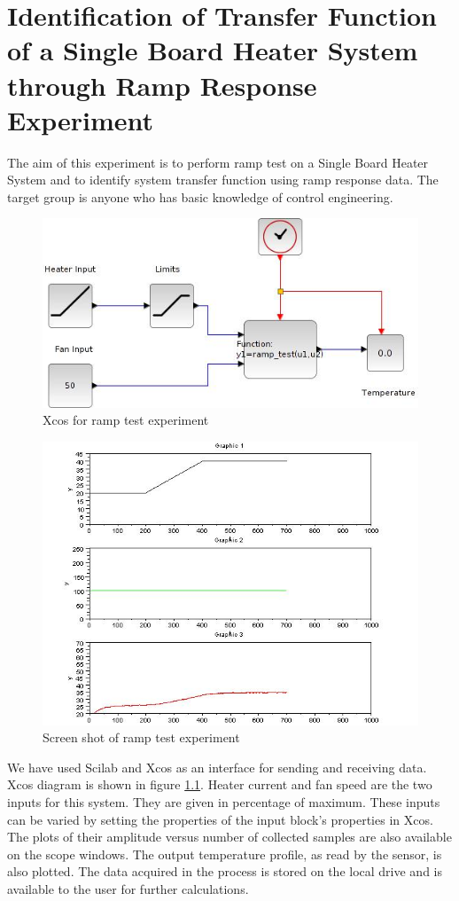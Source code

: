 \chapter{Identification of Transfer Function of a Single Board Heater System through Ramp Response Experiment}\label{chap2}
The aim of this experiment is to perform ramp test on a Single Board Heater System and to identify system transfer 
function using ramp response data. The target group is anyone who has basic knowledge of control engineering.

\begin{figure}
\centering
\includegraphics[width=0.7\linewidth]{Ramp-test_manual/ramp_test.jpg}
\caption{Xcos for ramp test experiment}
\label{Xcos_rt}
\end{figure} 

\begin{figure}
\centering
\includegraphics[width=\linewidth]{Ramp-test_manual/ramp_plot.jpg}
\caption{Screen shot of ramp test experiment}
\end{figure}

We have used Scilab and Xcos as an interface for sending and receiving data. 
Xcos diagram is shown in figure \ref{Xcos_rt}. Heater current and fan speed are the two inputs for this system. 
They are given in percentage of maximum. These inputs can be varied by setting the properties of the input block's properties 
in Xcos. The plots of their amplitude versus number of collected samples are also available on the scope windows. 
The output temperature profile, as read by the sensor, is also plotted. The data acquired in the process is stored on the 
local drive and is available to the user for further calculations.

